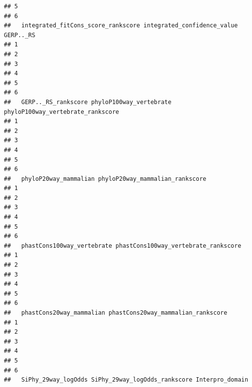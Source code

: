 \documentclass[
]{article}
\begin{document}
\begin{verbatim}
## 5                                                    
## 6                                                    
##   integrated_fitCons_score_rankscore integrated_confidence_value GERP.._RS
## 1                                                                         
## 2                                                                         
## 3                                                                         
## 4                                                                         
## 5                                                                         
## 6                                                                         
##   GERP.._RS_rankscore phyloP100way_vertebrate phyloP100way_vertebrate_rankscore
## 1                                                                              
## 2                                                                              
## 3                                                                              
## 4                                                                              
## 5                                                                              
## 6                                                                              
##   phyloP20way_mammalian phyloP20way_mammalian_rankscore
## 1                                                      
## 2                                                      
## 3                                                      
## 4                                                      
## 5                                                      
## 6                                                      
##   phastCons100way_vertebrate phastCons100way_vertebrate_rankscore
## 1                                                                
## 2                                                                
## 3                                                                
## 4                                                                
## 5                                                                
## 6                                                                
##   phastCons20way_mammalian phastCons20way_mammalian_rankscore
## 1                                                            
## 2                                                            
## 3                                                            
## 4                                                            
## 5                                                            
## 6                                                            
##   SiPhy_29way_logOdds SiPhy_29way_logOdds_rankscore Interpro_domain

\end{verbatim}
\end{document}
